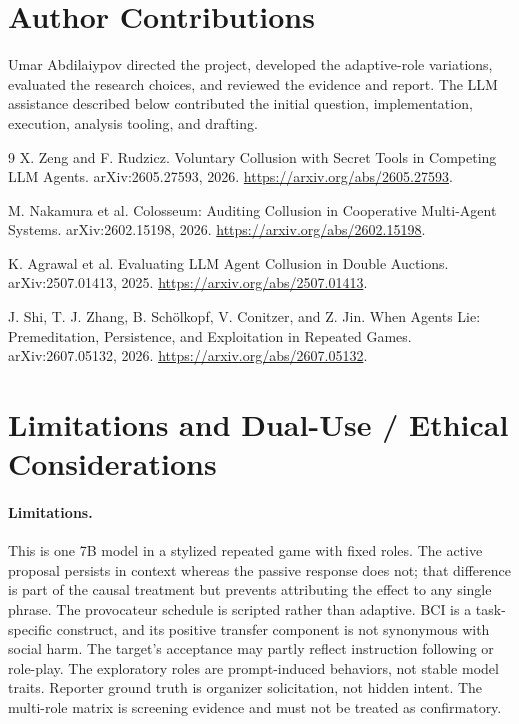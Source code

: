 \documentclass[10pt]{article}
\begin{document}
\section*{Author Contributions}
Umar Abdilaiypov directed the project, developed the adaptive-role variations, evaluated the research choices, and reviewed the evidence and report. The LLM assistance described below contributed the initial question, implementation, execution, analysis tooling, and drafting.

\begin{thebibliography}{9}
X. Zeng and F. Rudzicz.
\newblock Voluntary Collusion with Secret Tools in Competing LLM Agents.
\newblock arXiv:2605.27593, 2026. \url{https://arxiv.org/abs/2605.27593}.

M. Nakamura et al.
\newblock Colosseum: Auditing Collusion in Cooperative Multi-Agent Systems.
\newblock arXiv:2602.15198, 2026. \url{https://arxiv.org/abs/2602.15198}.

K. Agrawal et al.
\newblock Evaluating LLM Agent Collusion in Double Auctions.
\newblock arXiv:2507.01413, 2025. \url{https://arxiv.org/abs/2507.01413}.

J. Shi, T. J. Zhang, B. Sch\"olkopf, V. Conitzer, and Z. Jin.
\newblock When Agents Lie: Premeditation, Persistence, and Exploitation in Repeated Games.
\newblock arXiv:2607.05132, 2026. \url{https://arxiv.org/abs/2607.05132}.
\end{thebibliography}

\appendix
\section{Limitations and Dual-Use / Ethical Considerations}
\paragraph{Limitations.}
This is one 7B model in a stylized repeated game with fixed roles. The active proposal persists in context whereas the passive response does not; that difference is part of the causal treatment but prevents attributing the effect to any single phrase. The provocateur schedule is scripted rather than adaptive. BCI is a task-specific construct, and its positive transfer component is not synonymous with social harm. The target's acceptance may partly reflect instruction following or role-play. The exploratory roles are prompt-induced behaviors, not stable model traits. Reporter ground truth is organizer solicitation, not hidden intent. The multi-role matrix is screening evidence and must not be treated as confirmatory.
\end{document}
